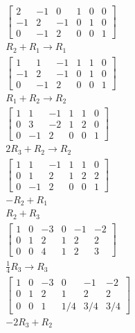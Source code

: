 \documentclass[main.tex]{subfiles}
\begin{document}
    $$
    \begin{aligned}
    &\left[\begin{array}{ccc|ccc}
    2 & -1 & 0 & 1 & 0 & 0 \\
    -1 & 2 & -1 & 0 & 1 & 0 \\
    0 & -1 & 2 & 0 & 0 & 1
    \end{array}\right]\\
    &R_{2}+R_{1} \rightarrow R_{1}\\
    &\left[\begin{array}{ccc|ccc}
    1 & 1 & -1 & 1 & 1 & 0 \\
    -1 & 2 & -1 & 0 & 1 & 0 \\
    0 & -1 & 2 & 0 & 0 & 1
    \end{array}\right]\\
    &R_{1}+R_{2} \rightarrow R_{2}\\
    &\left[\begin{array}{ccc|ccc}
    1 & 1 & -1 & 1 & 1 & 0 \\
    0 & 3 & -2 & 1 & 2 & 0 \\
    0 & -1 & 2 & 0 & 0 & 1
    \end{array}\right]\\
    &2 R_{3}+R_{2} \rightarrow R_{2}\\
    &\left[\begin{array}{ccc|ccc}
    1 & 1 & -1 & 1 & 1 & 0 \\
    0 & 1 & 2 & 1 & 2 & 2 \\
    0 & -1 & 2 & 0 & 0 & 1
    \end{array}\right]\\
    &-R_{2}+R_{1}\\
    &R_{2}+R_{3}\\
    &\left[\begin{array}{lll|lll}
    1 & 0 & -3 & 0 & -1 & -2 \\
    0 & 1 & 2 & 1 & 2 & 2 \\
    0 & 0 & 4 & 1 & 2 & 3
    \end{array}\right]\\
    &\frac{1}{4} R_{3} \rightarrow R_{3}\\
    &\left[\begin{array}{ccc|ccc}
    1 & 0 & -3 & 0 & -1 & -2 \\
    0 & 1 & 2 & 1 & 2 & 2 \\
    0 & 0 & 1 & 1 / 4 & 3 / 4 & 3 / 4
    \end{array}\right]\\
    &-2R_{3}+R_{2}\\

\end{aligned}$$
\end{document}
